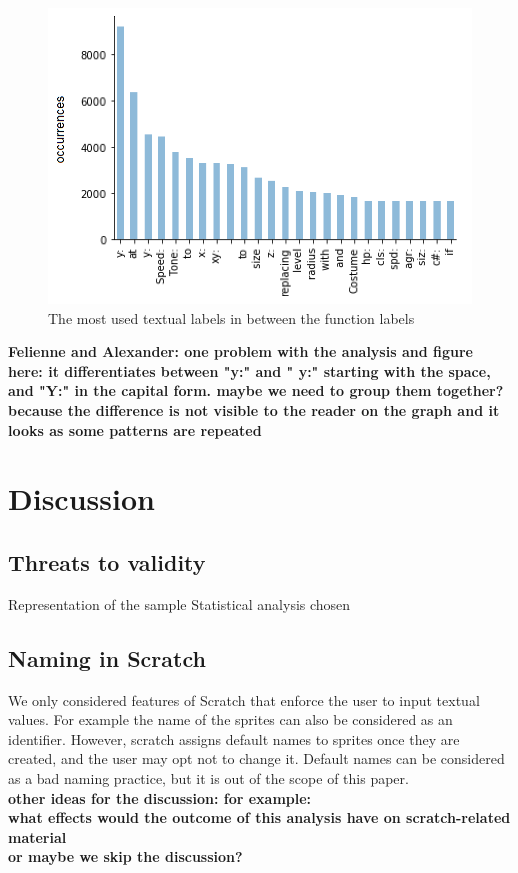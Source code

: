 \documentclass[conference]{IEEEtran}
\newcommand{\todo}[1]{ \textbf{#1} }
\begin{document}
\begin{figure}
	\begin{center}
		\includegraphics[width=\columnwidth]{fig/text_in_the_middle_func_occurrences}
		\caption{The most used textual labels in between the function labels }
		\label{fig:labels}
	\end{center}
\end{figure} 
\todo{Felienne and Alexander: one problem with the analysis and figure here: it differentiates between "y:" and " y:" starting with the space, and "Y:" in the capital form. maybe we need to group them together? because the difference is not visible to the reader on the graph and it looks as some patterns are repeated }



 \section{Discussion}
\subsection{Threats to validity}
Representation of the sample
Statistical analysis chosen
\subsection{Naming in Scratch}
We only considered features of Scratch that enforce the user to input textual values. For example the name of the sprites can also be considered as an identifier. However, scratch assigns default names to sprites once they are created, and the user may opt not to change it. Default names can be considered as a bad naming practice, but it is out of the scope of this paper.\\
\todo{other ideas for the discussion: for example: \\
what effects would the outcome of this analysis have on scratch-related material\\
or maybe we skip the discussion?
}
\end{document}

